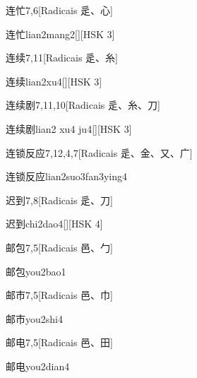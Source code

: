 \begin{entry}{连忙}{7,6}[Radicais ⾡、⼼]
  \begin{phonetics}{连忙}{lian2mang2}[][HSK 3]
  \end{phonetics}
\end{entry}

\begin{entry}{连续}{7,11}[Radicais ⾡、⽷]
  \begin{phonetics}{连续}{lian2xu4}[][HSK 3]
  \end{phonetics}
\end{entry}

\begin{entry}{连续剧}{7,11,10}[Radicais ⾡、⽷、⼑]
  \begin{phonetics}{连续剧}{lian2 xu4 ju4}[][HSK 3]
  \end{phonetics}
\end{entry}

\begin{entry}{连锁反应}{7,12,4,7}[Radicais ⾡、⾦、⼜、⼴]
  \begin{phonetics}{连锁反应}{lian2suo3fan3ying4}
  \end{phonetics}
\end{entry}

\begin{entry}{迟到}{7,8}[Radicais ⾡、⼑]
  \begin{phonetics}{迟到}{chi2dao4}[][HSK 4]
  \end{phonetics}
\end{entry}

\begin{entry}{邮包}{7,5}[Radicais ⾢、⼓]
  \begin{phonetics}{邮包}{you2bao1}
  \end{phonetics}
\end{entry}

\begin{entry}{邮市}{7,5}[Radicais ⾢、⼱]
  \begin{phonetics}{邮市}{you2shi4}
  \end{phonetics}
\end{entry}

\begin{entry}{邮电}{7,5}[Radicais ⾢、⽥]
  \begin{phonetics}{邮电}{you2dian4}
  \end{phonetics}
\end{entry}


